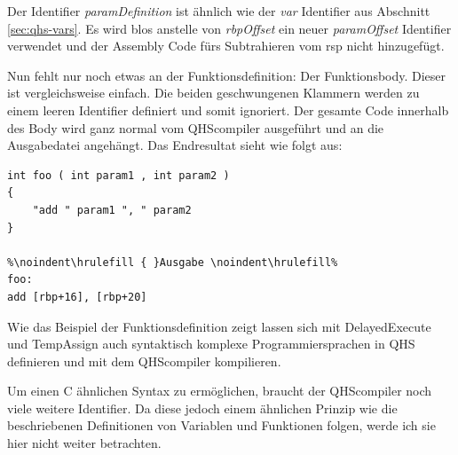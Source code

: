 Der Identifier \textit{paramDefinition} ist ähnlich wie der \textit{var} Identifier aus Abschnitt \ref{sec:qhs-vars}.
Es wird blos anstelle von \textit{rbpOffset} ein neuer \textit{paramOffset} Identifier verwendet und der Assembly Code fürs Subtrahieren vom rsp nicht hinzugefügt.

Nun fehlt nur noch etwas an der Funktionsdefinition: Der Funktionsbody. Dieser ist vergleichsweise einfach. Die beiden geschwungenen Klammern werden zu einem leeren Identifier definiert und somit ignoriert.
Der gesamte Code innerhalb des Body wird ganz normal vom QHScompiler ausgeführt und an die Ausgabedatei angehängt. Das Endresultat sieht wie folgt aus:

\begin{lstlisting}[language=QHS, caption=Finale Definition einer Funktion in QHS]
int foo ( int param1 , int param2 )
{
    "add " param1 ", " param2
}

%\noindent\hrulefill { }Ausgabe \noindent\hrulefill%
foo:
add [rbp+16], [rbp+20]
\end{lstlisting}

Wie das Beispiel der Funktionsdefinition zeigt lassen sich mit DelayedExecute und TempAssign auch syntaktisch komplexe Programmiersprachen in QHS definieren und mit dem QHScompiler kompilieren.

Um einen C ähnlichen Syntax zu ermöglichen, braucht der QHScompiler noch viele weitere Identifier.
Da diese jedoch einem ähnlichen Prinzip wie die beschriebenen Definitionen von Variablen und Funktionen folgen, werde ich sie hier nicht weiter betrachten.


    






